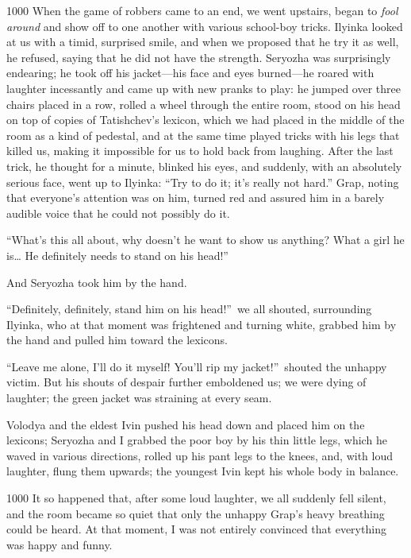 \begin{tolerant}{1000}
When the game of robbers came to an end, we went upstairs, began to \emph{fool around} and show off to one another with various school-boy tricks. Ilyinka looked at us with a timid, surprised smile, and when we proposed that he try it as well, he refused, saying that he did not have the strength. Seryozha was surprisingly endearing; he took off his jacket---his face and eyes burned---he roared with laughter incessantly and came up with new pranks to play: he jumped over three chairs placed in a row, rolled a wheel through the entire room, stood on his head on top of copies of Tatishchev's lexicon, which we had placed in the middle of the room as a kind of pedestal, and at the same time played tricks with his legs that killed us, making it impossible for us to hold back from laughing. After the last trick, he thought for a minute, blinked his eyes, and suddenly, with an absolutely serious face, went up to Ilyinka: ``Try to do it; it's really not hard.'' Grap, noting that everyone's attention was on him, turned red and assured him in a barely audible voice that he could not possibly do it. %
\end{tolerant}

``What's this all about, why doesn't he want to show us anything? What a girl he is\ldots{} He definitely needs to stand on his head!'' %

And Seryozha took him by the hand.

``Definitely, definitely, stand him on his head!''~we all shouted, surrounding Ilyinka, who at that moment was frightened and turning white, grabbed him by the hand and pulled him toward the lexicons.

``Leave me alone, I'll do it myself! You'll rip my jacket!''~shouted the unhappy victim. But his shouts of despair further emboldened us; we were dying of laughter; the green jacket was straining at every seam.

Volodya and the eldest Ivin pushed his head down and placed him on the lexicons; Seryozha and I grabbed the poor boy by his thin little legs, which he waved in various directions, rolled up his pant legs to the knees, and, with loud laughter, flung them upwards; the youngest Ivin kept his whole body in balance.

\begin{tolerant}{1000}
It so happened that, after some loud laughter, we all suddenly fell silent, and the room became so quiet that only the unhappy Grap's heavy breathing could be heard. At that moment, I was not entirely convinced that everything was happy and funny.
\end{tolerant}

